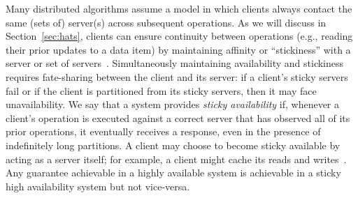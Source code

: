 Many distributed algorithms assume a model in which clients always
contact the same (sets of) server(s) across subsequent operations. As
we will discuss in Section~\ref{sec:hats}, clients can ensure
continuity between operations (e.g., reading their prior updates to a
data item) by maintaining affinity or ``stickiness'' with a server or
set of servers~\cite{vogels-defs}. Simultaneously maintaining
availability and stickiness requires fate-sharing between the client
and its server: if a client's sticky servers fail or if the client is
partitioned from its sticky servers, then it may face
unavailability. We say that a system provides \textit{sticky
  availability} if, whenever a client's operation is executed against
a correct server that has observed all of its prior operations, it
eventually receives a response, even in the presence of indefinitely
long partitions. A client may choose to become sticky available by
acting as a server itself; for example, a client might cache its reads
and writes~\cite{bolton, sessionguarantees, swift}. Any guarantee
achievable in a highly available system is achievable in a sticky high
availability system but not vice-versa.





